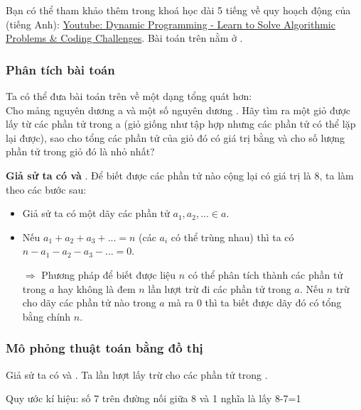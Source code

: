 \documentclass[main.tex]{subfiles}
\begin{document}
Bạn có thể tham khảo thêm trong khoá học dài 5 tiếng về quy hoạch động của  (tiếng Anh): \href{https://www.youtube.com/watch?v=oBt53YbR9Kk}{Youtube: Dynamic Programming - Learn to Solve Algorithmic Problems \& Coding Challenges}. Bài toán trên nằm ở .

\subsubsection{Phân tích bài toán}
Ta có thể đưa bài toán trên về một dạng tổng quát hơn:\\
Cho mảng nguyên dương \code a và một số nguyên dương . Hãy tìm ra một giỏ được lấy từ các phần tử trong \code a (giỏ giống như tập hợp nhưng các phần tử có thể lặp lại được), sao cho tổng các phần tử của giỏ đó có giá trị bằng  và cho số lượng phần tử trong giỏ đó là nhỏ nhất?

\textbf{Giả sử ta có  và }. Để biết được các phần tử nào cộng lại có giá trị là 8, ta làm theo các bước sau:
\begin{itemize}
    \item Giả sử ta có một dãy các phần tử $a_1, a_2, ... \in a$.
    \item Nếu $a_1+a_2+a_3+...=n$ (các $a_i$ có thể trùng nhau) thì ta có $n-a_1-a_2-a_3-...=0$.\par
    $\Rightarrow$ Phương pháp để biết được liệu $n$ có thể phân tích thành các phần tử trong $a$ hay không là đem $n$ lần lượt trừ đi các phần tử trong $a$. Nếu $n$ trừ cho dãy các phần tử nào trong $a$ mà ra $0$ thì ta biết được dãy đó có tổng bằng chính $n$.
\end{itemize}

\subsubsection{Mô phỏng thuật toán bằng đồ thị}
Giả sử ta có  và .
Ta lần lượt lấy  trừ cho các phần tử trong .

\begin{center}
\par Quy ước kí hiệu: số 7 trên đường nối giữa 8 và 1 nghĩa là lấy 8-7=1
\end{center}
\end{document}
